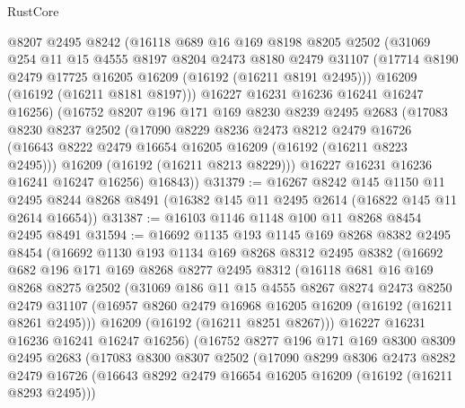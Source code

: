 \begin{lexlean}{RustCore}
\begin{coremodule}
      @8207
      @2495
      @8242
      (@16118
        @689
        @16
        @169
        @8198
        @8205
        @2502
        (@31069
          @254
          @11
          @15
          @4555
          @8197
          @8204
          @2473
          @8180
          @2479
          @31107
          (@17714 @8190 @2479 @17725 @16205 @16209 (@16192 (@16211 @8191 @2495)))
          @16209
          (@16192 (@16211 @8181 @8197)))
        @16227
        @16231
        @16236
        @16241
        @16247
        @16256)
      (@16752
        @8207
        @196
        @171
        @169
        @8230
        @8239
        @2495
        @2683
        (@17083
          @8230
          @8237
          @2502
          (@17090
            @8229
            @8236
            @2473
            @8212
            @2479
            @16726
            (@16643 @8222 @2479 @16654 @16205 @16209 (@16192 (@16211 @8223 @2495)))
            @16209
            (@16192 (@16211 @8213 @8229)))
          @16227
          @16231
          @16236
          @16241
          @16247
          @16256)
        @16843))
@31379 := @16267
    @8242
    @145
    @1150
    @11
    @2495
    @8244
    @8268
    @8491
    (@16382 @145 @11 @2495 @2614 (@16822 @145 @11 @2614 @16654))
@31387 := @16103 @1146 @1148 @100 @11 @8268 @8454 @2495 @8491
@31594 := @16692
    @1135
    @193
    @1145
    @169
    @8268
    @8382
    @2495
    @8454
    (@16692
      @1130
      @193
      @1134
      @169
      @8268
      @8312
      @2495
      @8382
      (@16692
        @682
        @196
        @171
        @169
        @8268
        @8277
        @2495
        @8312
        (@16118
          @681
          @16
          @169
          @8268
          @8275
          @2502
          (@31069
            @186
            @11
            @15
            @4555
            @8267
            @8274
            @2473
            @8250
            @2479
            @31107
            (@16957 @8260 @2479 @16968 @16205 @16209 (@16192 (@16211 @8261 @2495)))
            @16209
            (@16192 (@16211 @8251 @8267)))
          @16227
          @16231
          @16236
          @16241
          @16247
          @16256)
        (@16752
          @8277
          @196
          @171
          @169
          @8300
          @8309
          @2495
          @2683
          (@17083
            @8300
            @8307
            @2502
            (@17090
              @8299
              @8306
              @2473
              @8282
              @2479
              @16726
              (@16643 @8292 @2479 @16654 @16205 @16209 (@16192 (@16211 @8293 @2495)))

\end{coremodule}
\end{lexlean}
